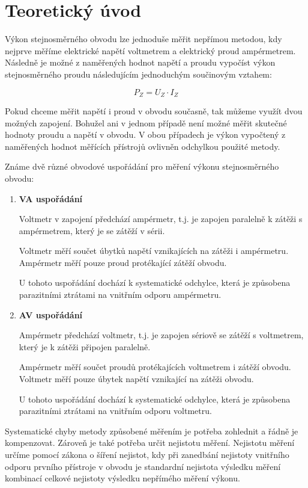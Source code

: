 \documentclass[a4paper, czech]{article}
\begin{document}
\section{Teoretický úvod}

Výkon stejnosměrného obvodu lze jednoduše měřit nepřímou metodou, kdy nejprve měříme elektrické napětí voltmetrem a elektrický proud ampérmetrem.
Následně je možné z naměřených hodnot napětí a proudu vypočíst výkon stejnosměrného proudu následujícím jednoduchým součinovým vztahem:

$$P_Z = U_Z \cdot I_Z$$

Pokud chceme měřit napětí i proud v obvodu současně, tak můžeme využít dvou možných zapojení.
Bohužel ani v jednom případě není možné měřit skutečné hodnoty proudu a napětí v obvodu.
V obou případech je výkon vypočtený z naměřených hodnot měřících přístrojů ovlivněn odchylkou použité metody.

Známe dvě různé obvodové uspořádání pro měření výkonu stejnosměrného obvodu:

\begin{enumerate}
    \item \textbf{VA uspořádání}

    Voltmetr v zapojení předchází ampérmetr, t.j. je zapojen paralelně k zátěži s ampérmetrem, který je se zátěží v sérii.

    Voltmetr měří součet úbytků napětí vznikajících na zátěži i ampérmetru.
    Ampérmetr měří pouze proud protékající zátěží obvodu.

    U tohoto uspořádání dochází k systematické odchylce, která je způsobena parazitními ztrátami na vnitřním odporu ampérmetru.

    \item \textbf{AV uspořádání}

    Ampérmetr předchází voltmetr, t.j. je zapojen sériově se zátěží s voltmetrem, který je k zátěži připojen paralelně.

    Ampérmetr měří součet proudů protékajících voltmetrem i zátěží obvodu.
    Voltmetr měří pouze úbytek napětí vznikající na zátěži obvodu.

    U tohoto uspořádání dochází k systematické odchylce, která je způsobena parazitními ztrátami na vnitřním odporu voltmetru.
\end{enumerate}

Systematické chyby metody způsobené měřením je potřeba zohlednit a řádně je kompenzovat.
Zároveň je také potřeba určit nejistotu měření.
Nejistotu měření určíme pomocí zákona o šíření nejistot, kdy při zanedbání nejistoty vnitřního odporu prvního přístroje v obvodu je standardní nejistota výsledku měření kombinací celkové nejistoty výsledku nepřímého měření výkonu. 
\end{document}
